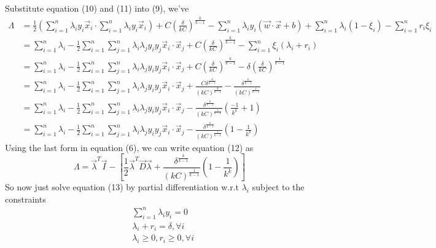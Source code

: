 \documentclass{article}
\begin{document}
Substitute equation (10) and (11) into (9), we've
\begin{align}
    \Lambda &= \frac{1}{2}(\displaystyle\sum_{i=1}^{n} \lambda_i y_i\Vec{x}_i \cdot\displaystyle\sum_{i=1}^{n} \lambda_i y_i\Vec{x}_i) + C(\frac{\delta}{kC})^\frac{k}{k-1} - \displaystyle\sum_{i=1}^{n} \lambda_iy_i(\Vec{w}\cdot\Vec{x}+b) + \displaystyle\sum_{i=1}^{n}\lambda_i(1-\xi_i) -  \displaystyle\sum_{i=1}^{n} r_i\xi_i \nonumber \\
    &= \displaystyle\sum_{i=1}^{n} \lambda_i - \frac{1}{2}\displaystyle\sum_{i=1}^{n}\displaystyle\sum_{j=1}^{n} \lambda_i\lambda_jy_iy_j\Vec{x}_i\cdot\Vec{x}_j + C(\frac{\delta}{kC})^\frac{k}{k-1} - \displaystyle\sum_{i=1}^{n}\xi_i(\lambda_i+r_i) \nonumber \\
    &= \displaystyle\sum_{i=1}^{n} \lambda_i - \frac{1}{2}\displaystyle\sum_{i=1}^{n}\displaystyle\sum_{j=1}^{n} \lambda_i\lambda_jy_iy_j\Vec{x}_i\cdot\Vec{x}_j + C(\frac{\delta}{kC})^\frac{k}{k-1} - \delta(\frac{\delta}{kC})^\frac{1}{k-1}
    \nonumber \\
    &= \displaystyle\sum_{i=1}^{n} \lambda_i - \frac{1}{2}\displaystyle\sum_{i=1}^{n}\displaystyle\sum_{j=1}^{n} \lambda_i\lambda_jy_iy_j\Vec{x}_i\cdot\Vec{x}_j + \frac{C\delta^\frac{k}{k-1}}{(kC)^\frac{k}{k-1}} - \frac{\delta^\frac{k}{k-1}}{(kC)^\frac{1}{k-1}} \nonumber \\
    &= \displaystyle\sum_{i=1}^{n} \lambda_i - \frac{1}{2}\displaystyle\sum_{i=1}^{n}\displaystyle\sum_{j=1}^{n} \lambda_i\lambda_jy_iy_j\Vec{x}_i\cdot\Vec{x}_j - \frac{\delta^\frac{k}{k-1}}{(kC)^\frac{1}{k-1}}(\frac{-1}{k^k}+1) \nonumber \\
    &= \displaystyle\sum_{i=1}^{n} \lambda_i - \frac{1}{2}\displaystyle\sum_{i=1}^{n}\displaystyle\sum_{j=1}^{n} \lambda_i\lambda_jy_iy_j\Vec{x}_i\cdot\Vec{x}_j - \frac{\delta^\frac{k}{k-1}}{(kC)^\frac{1}{k-1}}(1-\frac{1}{k^k})    
\end{align}
Using the last form in equation (6), we can write equation (12) as
\begin{equation}
    \Lambda = \Vec{\lambda}^T\Vec{I} - [\frac{1}{2}\Vec{\lambda}^T\Vec{D}\Vec{\lambda}+
    \frac{\delta^\frac{k}{k-1}}{(kC)^\frac{1}{k-1}}(1-\frac{1}{k^k})]
\end{equation}
So now just solve equation (13) by partial differentiation w.r.t $\lambda_i$ subject to the constraints
\begin{align*}
    &\displaystyle\sum_{i=1}^{n} \lambda_iy_i = 0 \\
    &\lambda_i + r_i = \delta, \forall i \\
    &\lambda_i \geq 0, r_i \geq 0, \forall i
\end{align*}
\end{document}
